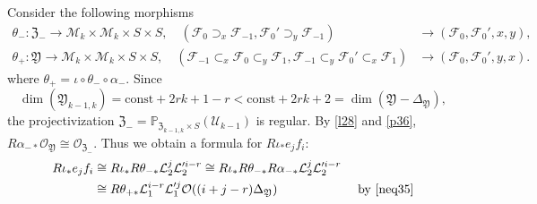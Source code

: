 \documentclass{amsart}
\numberwithin{equation}{section}
\newcommand\mc{\mathcal}
\newcommand\mf{\mathfrak}
\newcommand\mb{\mathbb}
\theoremstyle{definition}
\theoremstyle{remark}
\begin{document}
Consider the following morphisms
\begin{align*}
\theta_{-}:\mf{Z}_{-}\to \mc{M}_{k}\times \mc{M}_{k}\times S\times S, \quad 
(\mc{F}_{0}\supset_{x} \mc{F}_{-1},\mc{F}_{0}'\supset_{y} \mc{F}_{-1})&\to (\mc{F}_{0},\mc{F}_{0}',x,y), \\
\theta_{+}:\mf{Y}\to \mc{M}_{k}\times \mc{M}_{k}\times S\times S, \quad
(\mc{F}_{-1}\subset_{x}\mc{F}_{0}\subset_{y}\mc{F}_{1}, \mc{F}_{-1}\subset_{y}\mc{F}_{0}'\subset_{x}\mc{F}_{1})&\to (\mc{F}_{0},\mc{F}_{0}',y,x).
\end{align*}
where $\theta_{+}=\iota\circ \theta_{-}\circ \alpha_{-}$.
Since 
$$\dim(\mf{Y}_{k-1,k})=\mathrm{const}+2rk+1-r<\mathrm{const}+2rk+2=\dim(\mf{Y}-\Delta_{\mf{Y}}),$$
the projectivization $\mf{Z}_{-}=\mb{P}_{\mf{Z}_{k-1,k}\times S}(\mc{U}_{k-1})$ is regular. By \cref{l28} and \cref{p36}, $R\alpha_{-*}\mc{O}_{\mf{Y}}\cong \mc{O}_{\mf{Z}_{-}}$. Thus we obtain a formula for $R\iota_{*}e_{j}f_{i}$:
\begin{align}
   \label{n42}  R\iota_{*}e_{j}f_{i}&\cong R\iota_{*}R\theta_{-*}\mc{L}_{2}^{j}\mc{L}_{2}'^{i-r}\cong R\iota_{*}R\theta_{-*}R\alpha_{-*}\mc{L}_{2}^{j}\mc{L}_{2}'^{i-r} & \\
                      &\cong R\theta_{+*}\mc{L}_{1}^{i-r}\mc{L}_{1}'^{j}\mc{O}((i+j-r)\Delta_{\mf{Y}})  & \text{ by } \nonumber \cref{neq35} 
\end{align}
\end{document}
